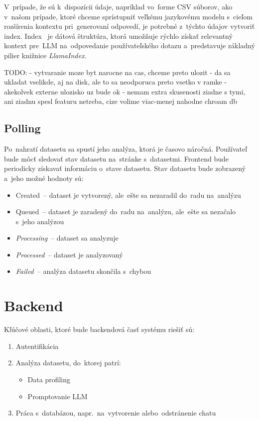 V~prípade, že sú k~dispozícii údaje, napríklad vo~forme CSV súborov, ako v~našom prípade, ktoré chceme sprístupniť veľkému jazykovému modelu s~cieľom rozšírenia kontextu pri~generovaní odpovedí, je potrebné z~týchto údajov vytvoriť index. Index~\cite{index} je dátová štruktúra, ktorá umožňuje rýchlo získať relevantný kontext pre~LLM na~odpovedanie používateľského dotazu a~predstavuje základný pilier knižnice \textit{LlamaIndex}.

TODO:
- vytvaranie moze byt narocne na cas, chceme preto ulozit
- da sa ukladat vselikde, aj na disk, ale to sa neodporuca preto vsetko v ramke
- akekolvek externe ulozisko uz bude ok
- nemam extra skusenosti ziadne s tymi, ani ziadnu spesl featuru netreba, cize volime viac-menej nahodne chroam db








\subsection{Polling}

Po~nahratí datasetu sa spustí jeho analýza, ktorá je časovo náročná. Používateľ bude môcť sledovať stav datasetu na~stránke s~datasetmi. Frontend bude periodicky získavať informáciu o~stave datasetu. Stav datasetu bude zobrazený a~jeho možné hodnoty sú:
\begin{itemize}
\item Created~-- dataset je vytvorený, ale~ešte sa nezaradil do~radu na~analýzu
\item Queued~-- dataset je zaradený do~radu na~analýzu, ale~ešte sa nezačalo s~jeho analýzou
\item \textit{Processing}~-- dataset sa analyzuje
\item \textit{Processed}~-- dataset je analyzovaný
\item \textit{Failed}~-- analýza datasetu skončila s~chybou
\end{itemize}

\section{Backend}

Kľúčové oblasti, ktoré bude backendová časť systému riešiť sú:
\begin{enumerate}
\item Autentifikácia
\item Analýza datasetu, do~ktorej patrí:
\begin{itemize}
\item Data profiling
\item Promptovanie LLM
\end{itemize}
\item Práca s~databázou, napr.~na~vytvorenie alebo~odstránenie chatu
\end{enumerate}

